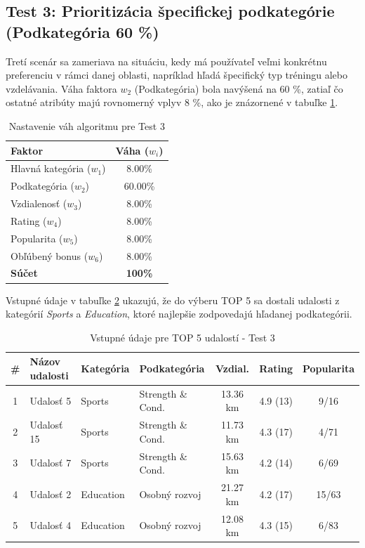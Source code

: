 \documentclass[12pt,a4paper]{article}
\begin{document}
\subsection{Test 3: Prioritizácia špecifickej podkategórie (Podkategória 60 \%)}

Tretí scenár sa zameriava na situáciu, kedy má používateľ veľmi konkrétnu preferenciu v rámci danej oblasti, napríklad hľadá špecifický typ tréningu alebo vzdelávania. Váha faktora $w_2$ (Podkategória) bola navýšená na 60 \%, zatiaľ čo ostatné atribúty majú rovnomerný vplyv 8 \%, ako je znázornené v tabuľke \ref{tab:vahy_test3}.

\begin{table}[H]
\centering
\begin{tabular}{|l|c|}
\hline
\textbf{Faktor} & \textbf{Váha ($w_i$)} \\
\hline
Hlavná kategória ($w_1$) & 8.00\% \\
Podkategória ($w_2$) & 60.00\% \\
Vzdialenosť ($w_3$) & 8.00\% \\
Rating ($w_4$) & 8.00\% \\
Popularita ($w_5$) & 8.00\% \\
Obľúbený bonus ($w_6$) & 8.00\% \\
\hline
\textbf{Súčet} & \textbf{100\%} \\
\hline
\end{tabular}
\caption{Nastavenie váh algoritmu pre Test 3}
\label{tab:vahy_test3}
\end{table}

Vstupné údaje v tabuľke \ref{tab:data_test3} ukazujú, že do výberu TOP 5 sa dostali udalosti z kategórií \textit{Sports} a \textit{Education}, ktoré najlepšie zodpovedajú hľadanej podkategórii.

\begin{table}[H]
\centering
\small
\begin{tabular}{|c|l|l|l|c|c|c|}
\hline
\textbf{\#} & \textbf{Názov udalosti} & \textbf{Kategória} & \textbf{Podkategória} & \textbf{Vzdial.} & \textbf{Rating} & \textbf{Popularita} \\
\hline
1 & Udalosť 5  & Sports    & Strength \& Cond. & 13.36 km & 4.9 (13) & 9/16 \\
2 & Udalosť 15 & Sports    & Strength \& Cond. & 11.73 km & 4.3 (17) & 4/71 \\
3 & Udalosť 7  & Sports    & Strength \& Cond. & 15.63 km & 4.2 (14) & 6/69 \\
4 & Udalosť 2  & Education & Osobný rozvoj     & 21.27 km & 4.2 (17) & 15/63 \\
5 & Udalosť 4  & Education & Osobný rozvoj     & 12.08 km & 4.3 (15) & 6/83 \\
\hline
\end{tabular}
\caption{Vstupné údaje pre TOP 5 udalostí - Test 3}
\label{tab:data_test3}
\end{table}
\end{document}

